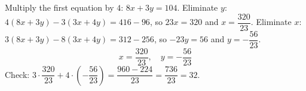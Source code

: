Multiply the first equation by $4$: $8x+3y=104$. Eliminate $y$: $4(8x+3y)-3(3x+4y)=416-96$, so $23x=320$ and $x=\dfrac{320}{23}$. Eliminate $x$: $3(8x+3y)-8(3x+4y)=312-256$, so $-23y=56$ and $y=-\dfrac{56}{23}$.
\[
\boxed{x=\dfrac{320}{23},\quad y=-\dfrac{56}{23}}
\]
Check: $3\cdot\dfrac{320}{23}+4\cdot\left(-\dfrac{56}{23}\right)=\dfrac{960-224}{23}=\dfrac{736}{23}=32$.
